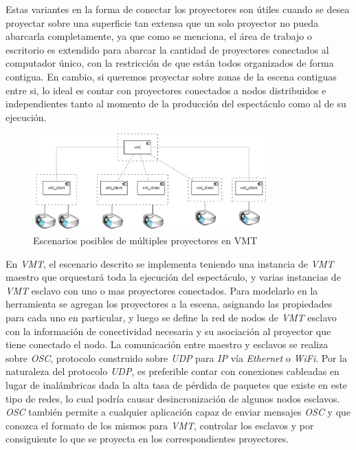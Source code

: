 Estas variantes en la forma de conectar los proyectores son útiles cuando se desea proyectar sobre una superficie tan extensa que un solo proyector no pueda abarcarla completamente, ya que como se menciona, el área de trabajo o escritorio es extendido para abarcar la cantidad de proyectores conectados al computador único, con la restricción de que están todos organizados de forma contigua. En cambio, si queremos proyectar sobre zonas de la escena contiguas entre si, lo ideal es contar con proyectores conectados a nodos distribuidos e independientes tanto al momento de la producción del espectáculo como al de su ejecución.

\begin{figure}[H]
  \centering
    \includegraphics[width=0.8\textwidth]{./Cap5_vmt/vmt_multiProjector.png}
  \caption{Escenarios posibles de múltiples proyectores en VMT}
  \label{fig:VMT-MultiProjector}
\end{figure}


En \emph{VMT}, el escenario descrito se implementa teniendo una instancia de \emph{VMT} maestro que orquestará toda la ejecución del espectáculo, y varias instancias de \emph{VMT} esclavo con uno o mas proyectores conectados. Para modelarlo en la herramienta se agregan los proyectores a la escena, asignando las propiedades para cada uno en particular, y luego se define la red de nodos de \emph{VMT} esclavo con la información de conectividad necesaria y su asociación al proyector que tiene conectado el nodo. La comunicación entre maestro y esclavos se realiza sobre \emph{OSC}, protocolo construido sobre \emph{UDP} para \emph{IP} vía \emph{Ethernet} o \emph{WiFi}. Por la naturaleza del protocolo \emph{UDP}, es preferible contar con conexiones cableadas en lugar de inalámbricas dada la alta tasa de pérdida de paquetes que existe en este tipo de redes, lo cual podría causar desincronización de algunos nodos esclavos. \emph{OSC} también permite a cualquier aplicación capaz de enviar mensajes \emph{OSC} y que conozca el formato de los mismos para \emph{VMT}, controlar los esclavos y por consiguiente lo que se proyecta en los correspondientes proyectores.

